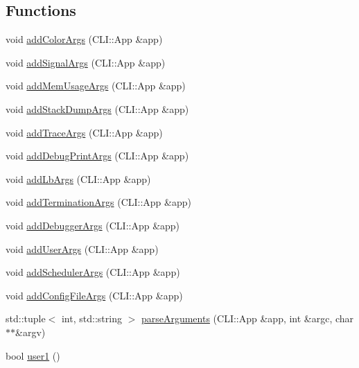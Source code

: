 \subsection*{Functions}
\begin{DoxyCompactItemize}
\item 
void \hyperlink{namespacevt_1_1arguments_ad20ec30a52a3746760ec7ce8eaaf9af4}{add\+Color\+Args} (C\+L\+I\+::\+App \&app)
\item 
void \hyperlink{namespacevt_1_1arguments_a61af811ee1284bef96edef93a52792c4}{add\+Signal\+Args} (C\+L\+I\+::\+App \&app)
\item 
void \hyperlink{namespacevt_1_1arguments_aaca43f74b5683e17a530a2227702f9e4}{add\+Mem\+Usage\+Args} (C\+L\+I\+::\+App \&app)
\item 
void \hyperlink{namespacevt_1_1arguments_a98bea139ecaff54e0b2b03afeba5a6a1}{add\+Stack\+Dump\+Args} (C\+L\+I\+::\+App \&app)
\item 
void \hyperlink{namespacevt_1_1arguments_a31bf3855abd5a792cb6c784858ef8b6c}{add\+Trace\+Args} (C\+L\+I\+::\+App \&app)
\item 
void \hyperlink{namespacevt_1_1arguments_aed7df943038a6c703af79f7bf81b0fdd}{add\+Debug\+Print\+Args} (C\+L\+I\+::\+App \&app)
\item 
void \hyperlink{namespacevt_1_1arguments_a6aad4b5d38f16351c068abfc268d5410}{add\+Lb\+Args} (C\+L\+I\+::\+App \&app)
\item 
void \hyperlink{namespacevt_1_1arguments_a700d5e06c85a85f40a3f8c36f62dddb6}{add\+Termination\+Args} (C\+L\+I\+::\+App \&app)
\item 
void \hyperlink{namespacevt_1_1arguments_a0ac7bcdb2013e7b486c1f6e052cd8731}{add\+Debugger\+Args} (C\+L\+I\+::\+App \&app)
\item 
void \hyperlink{namespacevt_1_1arguments_a1c50652e9209a72449953853975d4817}{add\+User\+Args} (C\+L\+I\+::\+App \&app)
\item 
void \hyperlink{namespacevt_1_1arguments_a586a9f239bd236bf2bc6ec02b1290fcc}{add\+Scheduler\+Args} (C\+L\+I\+::\+App \&app)
\item 
void \hyperlink{namespacevt_1_1arguments_a51a78d08f9d27671e3865515311af00a}{add\+Config\+File\+Args} (C\+L\+I\+::\+App \&app)
\item 
std\+::tuple$<$ int, std\+::string $>$ \hyperlink{namespacevt_1_1arguments_a39c463c5d2743546d1035d9654f9da77}{parse\+Arguments} (C\+L\+I\+::\+App \&app, int \&argc, char $\ast$$\ast$\&argv)
\item 
bool \hyperlink{namespacevt_1_1arguments_afe229ddf0b473e54fac5ff6884b07ad0}{user1} ()
$$
\end{DoxyCompactItemize}

